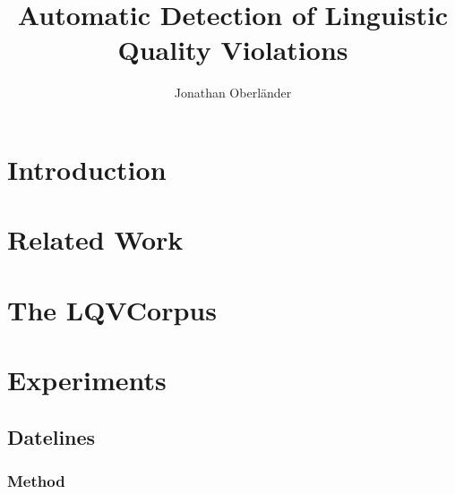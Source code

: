 \documentclass[a4paper,10pt]{scrartcl}
\author{Jonathan Oberländer}
\title{Automatic Detection of Linguistic Quality Violations}
\begin{document}
\maketitle










\section{Introduction}

\section{Related Work}

\section{The LQVCorpus}

\section{Experiments}
\subsection{Datelines}
\subsubsection{Method}
\end{document}
